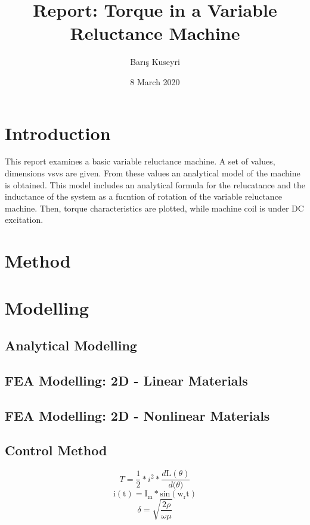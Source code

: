 \documentclass[a4paper, 11pt]{article}
\begin{document}
\title{Report: Torque in a Variable Reluctance Machine}
\author{Barış Kuseyri}
\date{8 March 2020}
\maketitle

\tableofcontents
\newpage

\section{Introduction}
\label{sec1}
This report examines a basic variable reluctance machine. A set of values, dimensions vsvs are given. From these values an analytical model of the machine is obtained. This model includes an analytical formula for the relucatance and the inductance of the system as a fucntion of rotation of the variable reluctance machine. Then, torque characteristics are plotted, while machine coil is under DC excitation. 
\section{Method}
\section{Modelling}
\subsection{Analytical Modelling}
\subsection{FEA Modelling: 2D - Linear Materials}

\subsection{FEA Modelling: 2D - Nonlinear Materials}
\subsection{Control Method}

\begin{equation}
\label{skineffect}
	T=\frac{1}{2}*i^2*\frac{d\mathrm L(\theta)}{d\mathrm (\theta)}
    \label{biotsavart}
\end{equation}
\begin{equation}
\label{skineffect}
	\mathrm{i(t)}=\mathrm{I_m}*\mathrm{sin(w_rt)}
\end{equation}
\begin{equation}
    \delta=\sqrt{\frac{2\rho}{\omega\mu}}
\end{equation}
\end{document}
